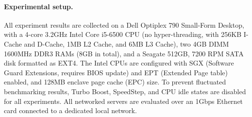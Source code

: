 


\paragraph{Experimental setup.}

All experiment results are collected on a Dell Optiplex 790 Small-Form Desktop,
with a 4-core 3.2GHz Intel Core i5-6500 CPU (no hyper-threading, with 256KB I-Cache and D-Cache, 1MB L2 Cache, and 6MB L3 Cache),
two 4GB DIMM 1600MHz DDR3 RAMs (8GB in total), and a Seagate 512GB, 7200 RPM SATA disk formatted as EXT4.
The Intel CPUs are configured with SGX (Software Guard Extensions, requires BIOS update) and EPT (Extended Page table) enabled, and 128MB enclave page cache (EPC) size.
To prevent fluctuated benchmarking results,
Turbo Boost, SpeedStep, and CPU idle states are disabled for
all experiments.
All networked servers are evaluated over an 1Gbps Ethernet card connected to a dedicated local network.

